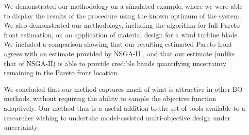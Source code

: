 \documentclass[10pt,a4paper]{article}
\begin{document}
We demonstrated our methodology on a simulated example, where we were able to display the results of the procedure using the known optimum of the system.
We also demonstrated our methodology, including the algorithm for full Pareto front estimation, on an application of material design for a wind turbine blade.
We included a comparison showing that our resulting estimated Pareto front agrees with an estimate provided by NSGA-II \citep{Deb2002}, and that our estimate (unlike that of NSGA-II) is able to provide credible bands quantifying uncertainty remaining in the Pareto front location.

We concluded that our method captures much of what is attractive in other BO methods, without requiring the ability to sample the objective function adaptively.
Our method thus is a useful addition to the set of tools available to a researcher wishing to undertake model-assisted multi-objective design under uncertainty.





	
\end{document}
